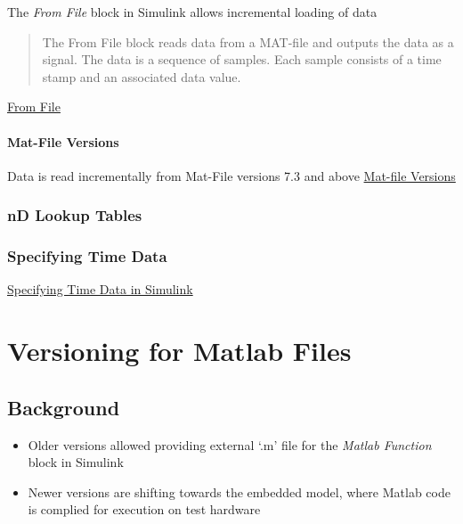 \documentclass[]{book}
\providecommand{\tightlist}{%
  \setlength{\itemsep}{0pt}\setlength{\parskip}{0pt}}
\let\oldparagraph\paragraph
\renewcommand{\paragraph}[1]{\oldparagraph{#1}\mbox{}}
\begin{document}
The \emph{From File} block in Simulink allows incremental loading of
data

\begin{quote}
The From File block reads data from a MAT-file and outputs the data as a
signal. The data is a sequence of samples. Each sample consists of a
time stamp and an associated data value.
\end{quote}

\href{http://www.mathworks.com/help/simulink/slref/fromfile.html}{From
File}

\paragraph{Mat-File Versions}\label{mat-file-versions}

Data is read incrementally from Mat-File versions 7.3 and above
\href{http://www.mathworks.com/help/matlab/import_export/mat-file-versions.html}{Mat-file
Versions}

\subsubsection{nD Lookup Tables}\label{nd-lookup-tables}

\subsubsection{Specifying Time Data}\label{specifying-time-data}

\href{http://www.mathworks.com/help/simulink/ug/importing-data-structures-to-a-root-level-input-port.html\#bsuwoyk}{Specifying
Time Data in Simulink}

\section{Versioning for Matlab Files}\label{versioning-for-matlab-files}

\subsection{Background}\label{background}

\begin{itemize}
\tightlist
\item
  Older versions allowed providing external `.m' file for the
  \emph{Matlab Function} block in Simulink
\item
  Newer versions are shifting towards the embedded model, where Matlab
  code is complied for execution on test hardware
\end{itemize}
\end{document}
